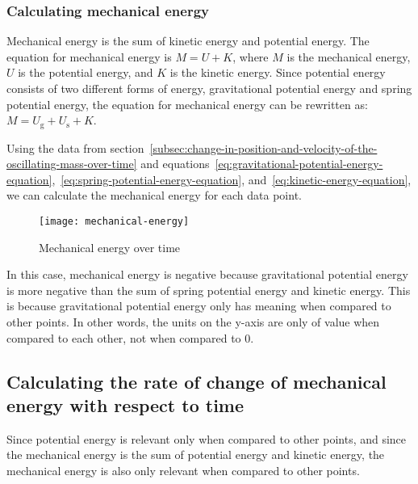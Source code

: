 \documentclass[titlepage]{article}
\begin{document}
            \subsubsection{Calculating mechanical energy}
                Mechanical energy is the sum of kinetic energy and potential energy.
                The equation for mechanical energy is $M = U + K$, where $M$ is the mechanical energy, $U$ is the potential energy, and $K$ is the kinetic energy.
                Since potential energy consists of two different forms of energy, gravitational potential energy and spring potential energy, the equation for mechanical energy can be rewritten as: $M = U_{\text{g}} + U_{\text{s}} + K$.
                
                Using the data from section~\ref{subsec:change-in-position-and-velocity-of-the-oscillating-mass-over-time} and equations~\ref{eq:gravitational-potential-energy-equation},~\ref{eq:spring-potential-energy-equation}, and~\ref{eq:kinetic-energy-equation}, we can calculate the mechanical energy for each data point.
                
                \begin{figure}[H]
                    \centering
                    \texttt{[image: mechanical-energy]}
                    \caption{Mechanical energy over time}
                    \label{fig:mechanical-energy}
                \end{figure}
                
                In this case, mechanical energy is negative because gravitational potential energy is more negative than the sum of spring potential energy and kinetic energy.
                This is because gravitational potential energy only has meaning when compared to other points.
                In other words, the units on the y-axis are only of value when compared to each other, not when compared to 0.
        
        \subsection{Calculating the rate of change of mechanical energy with respect to time}\label{subsec:calculating-the-rate-of-change-of-mechanical-energy-over-time}
            Since potential energy is relevant only when compared to other points, and since the mechanical energy is the sum of potential energy and kinetic energy, the mechanical energy is also only relevant when compared to other points.
            
\end{document}
